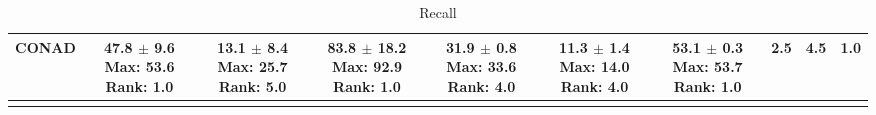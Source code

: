 \begin{longtable}{|l|c|c|c|c|c|c|c|c|c|}
CONAD & \makecell{ 47.8 $\pm$ 9.6 \\ \scriptsize Max: 53.6 \\ \scriptsize Rank: 1.0 } & \makecell{ 13.1 $\pm$ 8.4 \\ \scriptsize Max: 25.7 \\ \scriptsize Rank: 5.0 } & \makecell{ 83.8 $\pm$ 18.2 \\ \scriptsize Max: 92.9 \\ \scriptsize Rank: 1.0 } & \makecell{ 31.9 $\pm$ 0.8 \\ \scriptsize Max: 33.6 \\ \scriptsize Rank: 4.0 } & \makecell{ 11.3 $\pm$ 1.4 \\ \scriptsize Max: 14.0 \\ \scriptsize Rank: 4.0 } & \makecell{ 53.1 $\pm$ 0.3 \\ \scriptsize Max: 53.7 \\ \scriptsize Rank: 1.0 } & 2.5 & 4.5 & 1.0 \\ \hline 
\caption{ Recall } \label{tab:synth_rec}
\end{longtable}
